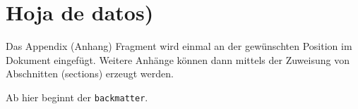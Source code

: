 \chapter{Hoja de datos)}

Das Appendix (Anhang) Fragment wird einmal an der gew\"{u}nschten Position
im Dokument eingef\"{u}gt. Weitere Anh\"{a}nge k\"{o}nnen dann mittels der
Zuweisung von Abschnitten (sections) erzeugt werden.

\bigskip

Ab hier beginnt der \verb|backmatter|.
